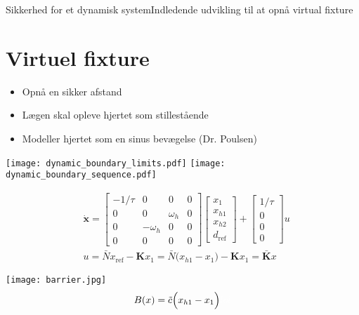 \begin{frame}{Sikkerhed for et dynamisk system}{Indledende udvikling til at opnå virtual fixture}
\section{Virtuel fixture}
\vspace*{-0.7cm}
\begin{block}{}
	\begin{itemize}
		\item Opnå en sikker afstand
		\item Lægen skal opleve hjertet som stillestående
		\item Modeller hjertet som en sinus bevægelse (Dr. Poulsen)
	\end{itemize}
\end{block}
\texttt{[image: dynamic\_boundary\_limits.pdf]} \hspace*{0.4cm}
\texttt{[image: dynamic\_boundary\_sequence.pdf]}

\begin{minipage}{0.7\textwidth}
\scriptsize
\begin{align*}
& \dot{\textbf{x}} = \begin{bmatrix}
-1/\tau & 0 & 0 & 0 \\
0 & 0 & \omega_h & 0 \\
0 & -\omega_h & 0 & 0 \\
0 & 0 & 0 & 0
\end{bmatrix} \begin{bmatrix}
x_1 \\ x_{h1} \\ x_{h2} \\ d_\text{ref}
\end{bmatrix} + \begin{bmatrix}
1/\tau \\ 0 \\ 0 \\ 0
\end{bmatrix} u \\
&  u = \bar{N} x_\text{ref} - \textbf{K} x_1 = \bar{N}\Big( x_{h1} - x_1 \Big) - \textbf{K} x_1 = \bar{\textbf{K}}x
\end{align*}
\end{minipage}
\hspace*{0.1cm}
\begin{minipage}{0.25\textwidth}
\vspace*{0.2cm}
\texttt{[image: barrier.jpg]}
\hspace*{-0.3cm}
\vspace*{-0.2cm} \scriptsize
\begin{align*}
B(x) = \tilde{c}\Big( x_{h1} - x_1 \Big){\color{white}{lol}}
\end{align*}
\end{minipage}
\end{frame}

